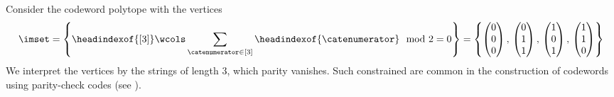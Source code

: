 \begin{example}
    Consider the codeword polytope with the vertices
    \begin{align*}
        \imset
        =\left\{\headindexof{[3]} \wcols \sum_{\catenumerator\in[3]} \headindexof{\catenumerator} \mod 2=0 \right\}
        = \left\{\begin{pmatrix}
                        0 \\ 0 \\ 0
            \end{pmatrix},\,\begin{pmatrix}
                        0 \\ 1 \\ 1
            \end{pmatrix},\,\begin{pmatrix}
                        1 \\ 0 \\ 1
            \end{pmatrix},\,\begin{pmatrix}
                        1 \\ 1 \\ 0
            \end{pmatrix}\right\}
    \end{align*}
    We interpret the vertices by the strings of length $3$, which parity vanishes.
    Such constrained are common in the construction of codewords using parity-check codes (see \cite{gallager_low-density_1963}).
    \begin{center}

\end{center}
\end{example}
